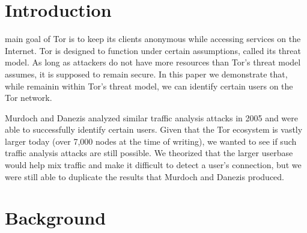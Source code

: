 \documentclass[12pt,journal]{IEEEtran}
\providecommand{\keywords}[1]{\textbf{Keywords} #1}
\begin{document}

\section{Introduction}
 main goal of Tor is to keep its clients anonymous while accessing services on the Internet. Tor is designed to function under certain assumptions, called its threat model. As long as attackers do not have more resources than Tor's threat model assumes, it is supposed to remain secure. In this paper we demonstrate that, while remainin within Tor's threat model, we can identify certain users on the Tor network.
\par
Murdoch and Danezis analyzed similar traffic analysis attacks in 2005 and were able to successfully identify certain users. Given that the Tor ecosystem is vastly larger today (over 7,000 nodes at the time of writing), we wanted to see if such traffic analysis attacks are still possible. We theorized that the larger userbase would help mix traffic and make it difficult to detect a user's connection, but we were still able to duplicate the results that Murdoch and Danezis produced.
\section{Background}
\end{document}
